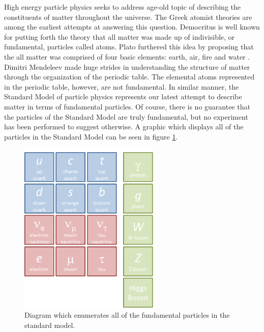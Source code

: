 High energy particle physics seeks to address age-old topic of describing the
constituents of matter throughout the universe.  The Greek atomist theories are
among the earliest attempts at answering this question.  Democritus is well
known for putting forth the theory that all matter was made up of indivisible,
or fundamental, particles called atoms.  Plato furthered this idea by proposing
that the all matter was comprised of four basic elements: earth, air, fire and
water \cite{berryman2008atomism}.  Dimitri Mendeleev made huge strides in
understanding the structure of matter through the organization of the periodic
table.  The elemental atoms represented in the periodic table, however, are not
fundamental.  In similar manner, the Standard Model of particle physics
represents our latest attempt to describe matter in terms of fundamental
particles.  Of course, there is no guarantee that the particles of the Standard
Model are truly fundamental, but no experiment has been performed to suggest
otherwise.  A graphic which displays all of the particles in the Standard Model
can be seen in figure \ref{sm}.



\begin{figure}[h]
  \begin{center}
    \includegraphics[width=0.6\textwidth]{figures/figures/sm.png}
  \end{center}
  \caption{Diagram which enumerates all of the fundamental particles in the
  standard model.}
  \label{sm}
\end{figure}

